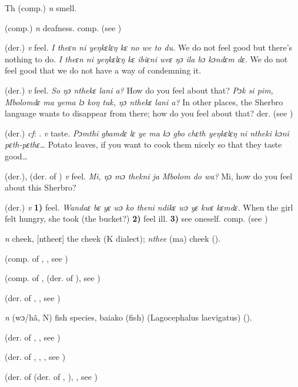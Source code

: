 \begin{letter}{Th}
 (comp.) \textit{n} smell.

 (comp.) \textit{n} deafness. comp.  (see )

 (der.) \textit{v} feel. \textit{I theɛn ni yeŋkɛlɛŋ kɛ no we to du.} We do not feel good but there's nothing to do. \textit{I theɛn ni yeŋkɛlɛŋ kɛ ibiɛni weɛ ŋɔ ila bɔ kɔndɛm dɛ.} We do not feel good that we do not have a way of condemning it.

 (der.) \textit{v} feel. \textit{So ŋɔ nthekɛ lani a?} How do you feel about that? \textit{Pɔk si pim, Mbolomdɛ ma yema lɔ koŋ tuk, ŋɔ nthekɛ lani a?} In other places, the Sherbro language wants to disappear from there; how do you feel about that? der.  (see ) 

 (der.) \textit{cf}: . \textit{v} taste. \textit{Pɔmthi gbamdɛ lɛ ye ma kɔ gbo chɛth yeŋkɛlɛŋ ni ntheki kɔni pɛth-pɛthɛ…} Potato leaves, if you want to cook them nicely so that they taste good…

 (der.), (der. of ) \textit{v} feel. \textit{Mi, ŋɔ mɔ thekni ja Mbolom do wa?} Mi, how do you feel about this Sherbro?

 (der.) \textit{v} \textbf{1)} feel. \textit{Wandaɛ bɛ yɛ wɔ ko theni ndikɛ wɔ yɛ kwɛ kɛmdɛ.} When the girl felt hungry, she took (the bucket?) \textbf{2)} feel ill. \textbf{3)} see oneself. comp.  (see )

 \textit{n} cheek, [ntheeɛ] the cheek (K dialect); \textit{nthee} (ma) cheek (\citealt{Pichl1967}). 

 (comp. of , , see ) 

 (comp. of ,  (der. of ), see )

 (der. of , , see ) 

 \textit{n} (wɔ/hã, N) fish species, baiako (fish) (Lagocephalus laevigatus) (\citealt{Pichl1967}). 

 (der. of , , see ) 

 (der. of , , , see ) 

 (der. of  (der. of , ), , see ) 


\end{letter}
